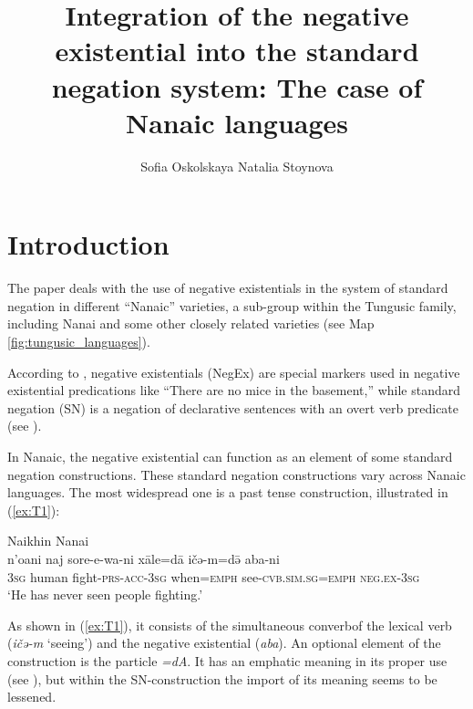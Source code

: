 \documentclass[output=paper]{langscibook}
\author{Sofia Oskolskaya \affiliation{Institute for Linguistic Studies, RAS} \lastand Natalia Stoynova \affiliation{Russian Language Institute, RAS \& NRU Higher School of Economics}}
\title{Integration of the negative existential into the standard negation system: The case of Nanaic languages}
\begin{document}
\maketitle

\section{Introduction}\label{sec:T1}

The paper deals with the use of negative existentials in the system of standard negation in different “Nanaic” varieties, a sub-group within the Tungusic family, including Nanai and some other closely related varieties (see Map \ref{fig:tungusic_languages}).

According to \citet[107]{Veselinova2013}, negative existentials (NegEx) are special markers used in negative existential predications like “There are no mice in the basement,” while standard negation (SN) is a negation of declarative sentences with an overt verb predicate (see \citealp[39–45]{Miestamo2005}).

In Nanaic, the negative existential can function as an element of some standard negation constructions. These standard negation constructions vary across Nanaic languages. The most widespread one is a past tense construction, illustrated in (\ref{ex:T1}):

\ea Naikhin Nanai \label{ex:T1}\\
	\gll n’oani	naj	sore-e-wa-ni	xāle=dā	ičə-m=də̄	aba-ni\\
	\textsc{3sg}	human	fight-\textsc{prs-acc-3sg}	when=\textsc{emph}	see-\textsc{cvb.sim.sg=emph}	\textsc{neg.ex-3sg}\\
	\glt `He has never seen people fighting.' \citep[154, text]{avrorin1986a}
\z

As shown in (\ref{ex:T1}), it consists of the simultaneous converb\footnotemark of the lexical verb (\textit{ičə-m} ‘seeing’) and the negative existential (\textit{aba}). An optional element of the construction is the particle \textit{=dA}. It has an emphatic meaning in its proper use (see \citealp[264]{avrorin1961a}), but within the SN-construction the import of its meaning seems to be lessened.
\end{document}
